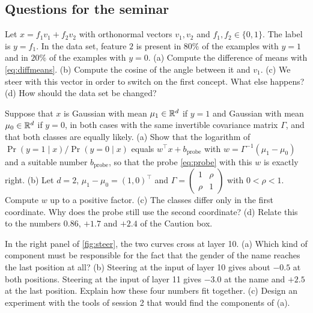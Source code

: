 \subsection*{Questions for the seminar}

\begin{exercise}\label{ex:contaminated}
Let $x=f_1v_1+f_2v_2$ with orthonormal vectors $v_1,v_2$ and $f_1,f_2\in\{0,1\}$. The label is $y=f_1$. In the data
set, feature $2$ is present in $80\%$ of the examples with $y=1$ and in $20\%$ of the examples with $y=0$.
(a) Compute the difference of means with \eqref{eq:diffmeans}. (b) Compute the cosine of the angle between it
and $v_1$. (c) We steer with this vector in order to switch on the first concept. What else happens? (d) How
should the data set be changed?
\end{exercise}

\begin{exercise}\label{ex:lda}
Suppose that $x$ is Gaussian with mean $\mu_1\in\mathbb{R}^d$ if $y=1$ and Gaussian with mean $\mu_0\in\mathbb{R}^d$ if $y=0$, in
both cases with the same invertible covariance matrix $\Gamma$, and that both classes are equally likely.
(a) Show that the logarithm of $\Pr(y=1\mid x)/\Pr(y=0\mid x)$ equals $w^\top x+b_{\mathrm{probe}}$ with
$w=\Gamma^{-1}(\mu_1-\mu_0)$ and a suitable number $b_{\mathrm{probe}}$, so that the probe \eqref{eq:probe} with this
$w$ is exactly right. (b) Let $d=2$, $\mu_1-\mu_0=(1,0)^\top$ and
$\Gamma=\begin{pmatrix}1&\rho\\ \rho&1\end{pmatrix}$ with $0<\rho<1$. Compute $w$ up to a positive factor. (c) The
classes differ only in the first coordinate. Why does the probe still use the second
coordinate? (d) Relate this to
the numbers $0.86$, $+1.7$ and $+2.4$ of the Caution box.
\end{exercise}

\begin{exercise}\label{ex:curves}
In the right panel of \cref{fig:steer}, the two curves cross at layer 10. (a) Which kind of component must be
responsible for the fact that the gender of the name reaches the last position at all? (b) Steering at the
input of layer 10 gives about $-0.5$ at both positions. Steering at the input of layer 11 gives $-3.0$ at the
name and $+2.5$ at the last position. Explain how these four numbers fit together. (c) Design an experiment with
the tools of session 2 that would find the components of (a).
\end{exercise}


